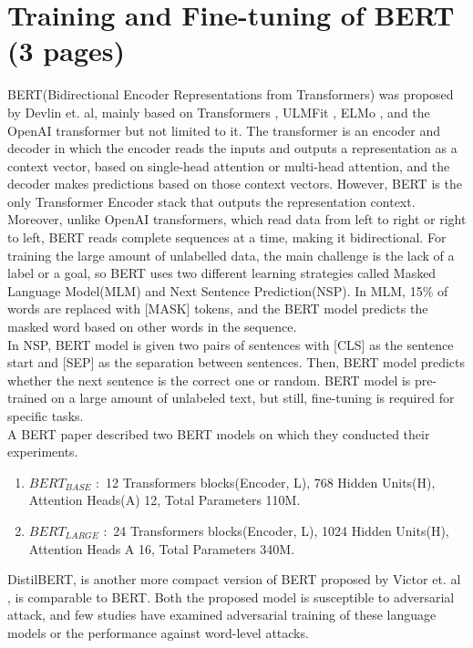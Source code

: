 \documentclass[%
	BCOR=8mm, %
	DIV=12, 
	toc=bibliography, %
	toc=listof, %
	oneside, %
	egregdoesnotlikesansseriftitles, %
	]{scrbook}
\begin{document}
\section{Training and Fine-tuning of BERT (3 pages)}
BERT(Bidirectional Encoder Representations from Transformers) was proposed by Devlin et$.$ al\cite{devlin_bert_2019}, mainly based on Transformers \cite{vaswani_attention_2017}, ULMFit \cite{howard_universal_2018}, ELMo \cite{peters_deep_2018}, and the OpenAI transformer \cite{radford_improving_nodate} but not limited to it. 
The transformer is an encoder and decoder in which the encoder reads the inputs and outputs a representation as a context vector, based on single-head attention or multi-head attention, and the decoder makes predictions based on those context vectors. However, BERT is the only Transformer Encoder stack that outputs the representation context. Moreover, unlike OpenAI transformers, which read data from left to right or right to left, BERT reads complete sequences at a time, making it bidirectional. 
For training the large amount of unlabelled data, the main challenge is the lack of a label or a goal, so BERT uses two different learning strategies called Masked Language Model(MLM) and Next Sentence Prediction(NSP).
In MLM, 15\% of words are replaced with [MASK] tokens, and the BERT model predicts the masked word based on other words in the sequence.\\
In NSP, BERT model is given two pairs of sentences with [CLS] as the sentence start and [SEP] as the separation between sentences. Then, BERT model predicts whether the next sentence is the correct one or random. 
BERT model is pre-trained on a large amount of unlabeled text, but still, fine-tuning is required for specific tasks.\\
A BERT paper \cite{devlin_bert_2019} described two BERT models on which they conducted their experiments.
\begin{enumerate}
\item $BERT_{BASE}$ $:$ 12 Transformers blocks(Encoder, L), 768 Hidden Units(H), Attention Heads(A) 12, Total Parameters 110M.
\item $BERT_{LARGE}$ $:$ 24 Transformers blocks(Encoder, L), 1024 Hidden Units(H), Attention Heads A 16, Total Parameters 340M.
\end{enumerate}
DistilBERT, is another more compact version of BERT proposed by Victor et$.$ al \cite{sanh_distilbert_2020}, is comparable to BERT. Both the proposed model is susceptible to adversarial attack, and few studies have examined adversarial training of these language models or the performance against word-level attacks.\\
\end{document}
